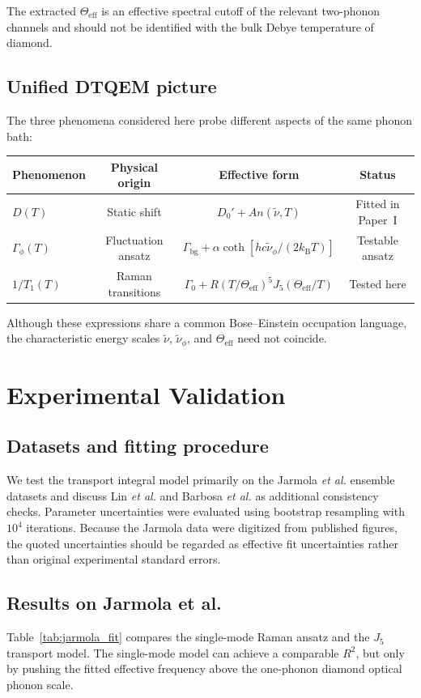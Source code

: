 \documentclass[12pt,a4paper]{article}
\begin{document}
The extracted $\Theta_{\mathrm{eff}}$ is an effective spectral cutoff of the relevant two-phonon channels and should not be identified with the bulk Debye temperature of diamond.

\subsection{Unified DTQEM picture}
The three phenomena considered here probe different aspects of the same phonon bath:
\begin{center}
\begin{tabular}{lccc}
\toprule
\textbf{Phenomenon} & \textbf{Physical origin} & \textbf{Effective form} & \textbf{Status} \\
\midrule
$D(T)$ & Static shift & $D_0'+A n(\tilde{\nu},T)$ & Fitted in Paper~I \\
$\Gamma_\phi(T)$ & Fluctuation ansatz & $\Gamma_{\mathrm{bg}}+\alpha\coth[hc\tilde{\nu}_\phi/(2k_{\mathrm B}T)]$ & Testable ansatz \\
$1/T_1(T)$ & Raman transitions & $\Gamma_0+R(T/\Theta_{\mathrm{eff}})^5J_5(\Theta_{\mathrm{eff}}/T)$ & Tested here \\
\bottomrule
\end{tabular}
\end{center}
Although these expressions share a common Bose--Einstein occupation language, the characteristic energy scales $\tilde{\nu}$, $\tilde{\nu}_\phi$, and $\Theta_{\mathrm{eff}}$ need not coincide.

\section{Experimental Validation}
\subsection{Datasets and fitting procedure}
We test the transport integral model primarily on the Jarmola \textit{et al.} ensemble datasets and discuss Lin \textit{et al.} and Barbosa \textit{et al.} as additional consistency checks. Parameter uncertainties were evaluated using bootstrap resampling with $10^4$ iterations. Because the Jarmola data were digitized from published figures, the quoted uncertainties should be regarded as effective fit uncertainties rather than original experimental standard errors.

\subsection{Results on Jarmola et al.}
Table~\ref{tab:jarmola_fit} compares the single-mode Raman ansatz and the $J_5$ transport model. The single-mode model can achieve a comparable $R^2$, but only by pushing the fitted effective frequency above the one-phonon diamond optical phonon scale.
\end{document}
